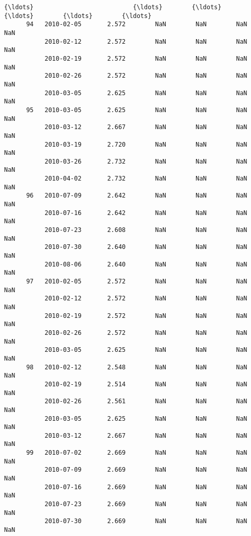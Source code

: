 \documentclass[11pt]{article}
\begin{document}
\begin{Verbatim}[commandchars=\\\{\}]
{\ldots}                           {\ldots}        {\ldots}        {\ldots}        {\ldots}        {\ldots}   
      94   2010-02-05       2.572        NaN        NaN        NaN        NaN   
           2010-02-12       2.572        NaN        NaN        NaN        NaN   
           2010-02-19       2.572        NaN        NaN        NaN        NaN   
           2010-02-26       2.572        NaN        NaN        NaN        NaN   
           2010-03-05       2.625        NaN        NaN        NaN        NaN   
      95   2010-03-05       2.625        NaN        NaN        NaN        NaN   
           2010-03-12       2.667        NaN        NaN        NaN        NaN   
           2010-03-19       2.720        NaN        NaN        NaN        NaN   
           2010-03-26       2.732        NaN        NaN        NaN        NaN   
           2010-04-02       2.732        NaN        NaN        NaN        NaN   
      96   2010-07-09       2.642        NaN        NaN        NaN        NaN   
           2010-07-16       2.642        NaN        NaN        NaN        NaN   
           2010-07-23       2.608        NaN        NaN        NaN        NaN   
           2010-07-30       2.640        NaN        NaN        NaN        NaN   
           2010-08-06       2.640        NaN        NaN        NaN        NaN   
      97   2010-02-05       2.572        NaN        NaN        NaN        NaN   
           2010-02-12       2.572        NaN        NaN        NaN        NaN   
           2010-02-19       2.572        NaN        NaN        NaN        NaN   
           2010-02-26       2.572        NaN        NaN        NaN        NaN   
           2010-03-05       2.625        NaN        NaN        NaN        NaN   
      98   2010-02-12       2.548        NaN        NaN        NaN        NaN   
           2010-02-19       2.514        NaN        NaN        NaN        NaN   
           2010-02-26       2.561        NaN        NaN        NaN        NaN   
           2010-03-05       2.625        NaN        NaN        NaN        NaN   
           2010-03-12       2.667        NaN        NaN        NaN        NaN   
      99   2010-07-02       2.669        NaN        NaN        NaN        NaN   
           2010-07-09       2.669        NaN        NaN        NaN        NaN   
           2010-07-16       2.669        NaN        NaN        NaN        NaN   
           2010-07-23       2.669        NaN        NaN        NaN        NaN   
           2010-07-30       2.669        NaN        NaN        NaN        NaN   


\end{Verbatim}
\end{document}
